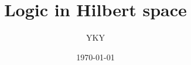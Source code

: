 


\usepackage{color}
\usepackage{mathtools}
\usepackage{hyperref}

\usepackage[backend=biber,style=numeric]{biblatex}


\usepackage{graphicx} %
\usepackage{tikz-cd}
\usepackage{tikz}
\usepackage[export]{adjustbox}%
\usepackage{verbatim} %


\newcommand{\underdash}[1]{%
	\tikz[baseline=(toUnderline.base)]{
		\node[inner sep=1pt,outer sep=10pt] (toUnderline) {#1};
		\draw[dashed] ([yshift=-0pt]toUnderline.south west) -- ([yshift=-0pt]toUnderline.south east);
	}%
}%


\newcommand{\highlight}[1]{\colorbox{pink}{$\displaystyle #1$}}

\newcommand{\emp}[1]{{\color{violet}\textbf{#1}}}
\newcommand*\confoundFace{$\vcenter{\hbox{\texttt{[image: ../confounded-face.jpg]}}}$}

\newcommand*{\Cdot}{\raisebox{-0.5ex}{\scalebox{2}{$\cdot$}}}
\newcommand{\witness}{\scalebox{0.6}{$\blacksquare$}}
\providecommand\Heytingarrow{\relbar\joinrel\mathrel{\vcenter{\hbox{\scalebox{0.75}{$\rhd$}}}}}



\title{\cc{\bfseries\color{blue}{\Huge Logic in Hilbert space}}
{{\Huge Logic in Hilbert space}}}
\author{YKY} %
\date{\today} %

